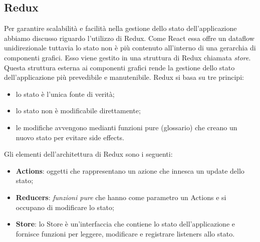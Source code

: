 \subsection{Redux}
Per garantire scalabilità e facilità nella gestione dello stato dell'applicazione abbiamo discusso riguardo l'utilizzo di Redux. Come React essa offre un dataflow unidirezionale tuttavia lo stato non è più contenuto all'interno di una gerarchia di componenti grafici. Esso viene gestito in una struttura di Redux chiamata \emph{store}. Questa struttura esterna ai componenti grafici rende la gestione dello stato dell'applicazione più prevedibile e manutenibile. Redux si basa su tre principi:
\begin{itemize}
	\item lo stato è l'unica fonte di verità;
	\item lo stato non è modificabile direttamente;
	\item le modifiche avvengono medianti funzioni pure (glossario) che creano un nuovo stato per evitare side effects.
\end{itemize}
\noindent
Gli elementi dell'architettura di Redux sono i seguenti:
\begin{itemize}
	\item \textbf{Actions}: oggetti che rappresentano un azione che innesca un update dello stato;
	\item \textbf{Reducers}: \emph{funzioni pure} che hanno come parametro un Actions e si occupano di modificare lo stato;
	\item \textbf{Store}: lo Store è un'interfaccia che contiene lo stato dell'applicazione e fornisce funzioni per leggere, modificare e registrare listeners allo stato.
\end{itemize}
\noindent

